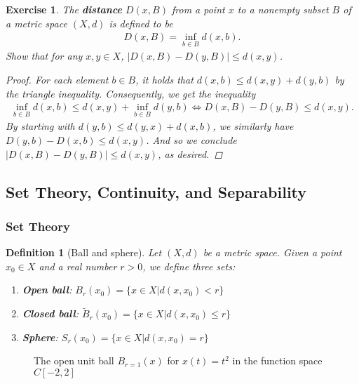 \documentclass[11pt]{article}
\theoremstyle{mystyle}
\newtheorem{defn}{Definition}[section]
\newtheorem{protoexer}{Exercise}[section]
\newenvironment{exer}
{\colorlet{shadecolor}{blue!15}\begin{shaded}\begin{protoexer}}
{\end{protoexer}\end{shaded}}
\newcommand{\0}{\mathbf{0}}
\begin{document}
\newpage
\begin{exer}\label{pttoset}
The \textbf{distance} $D(x, B)$ from a point $x$ to a nonempty subset $B$ of a metric space $(X, d)$ is defined to be
\begin{align*}
    D(x, B) = \inf_{b \in B} d(x, b).
\end{align*}
Show that for any $x, y \in X$, $|D(x, B) - D(y, B)| \leq d(x, y)$.
\begin{proof}
For each element $b \in B$, it holds that $d(x,b) \leq d(x, y) + d(y, b)$ by the triangle inequality. Consequently, we get the inequality 
\begin{align*}
    \inf_{b \in B} d(x, b) \leq d(x, y) + \inf_{b \in B} d(y, b) \iff D(x, B) - D(y, B) \leq d(x, y).
\end{align*}
By starting with $d(y, b) \leq d(y, x) + d(x, b)$, we similarly have $D(y, b) - D(x, b) \leq d(x, y)$. And so we conclude $|D(x, B) - D(y, B)| \leq d(x, y)$, as desired.
\end{proof}
\end{exer}

\subsection{Set Theory, Continuity, and Separability}

\subsubsection{Set Theory}\label{settheory}

\begin{defn}[Ball and sphere]
Let $(X, d)$ be a metric space. Given a point $x_0 \in X$ and a real number $r > 0$, we define three sets:
\begin{enumerate}
    \item \textbf{Open ball}: $B_r(x_0) = \{x \in X | d(x, x_0) < r \}$
    \item \textbf{Closed ball}: $\tilde{B}_r(x_0) = \{x \in X | d(x, x_0) \leq r \}$
    \item \textbf{Sphere}: $S_r(x_0) = \{x \in X | d(x, x_0) = r \}$
\end{enumerate}
\end{defn}

\begin{figure}[H]
\begin{center}
\end{center}
\caption*{The open unit ball $B_{r=1}(x)$ for $x(t) = t^2$ in the function space $C[-2, 2]$}
\end{figure}
\end{document}

